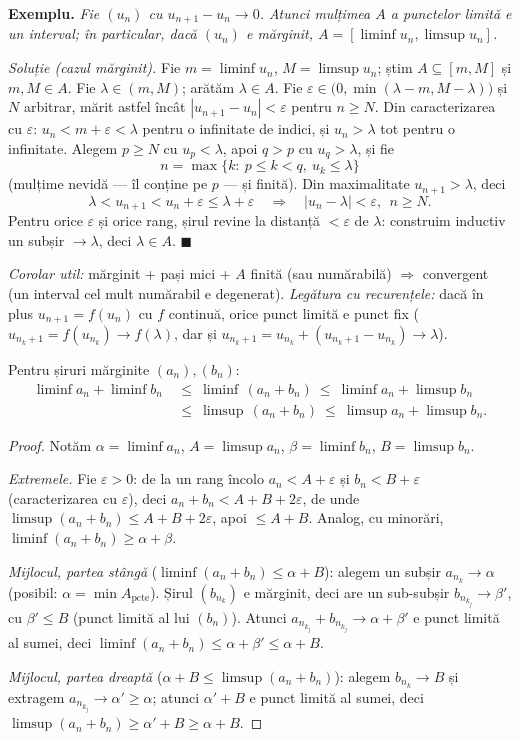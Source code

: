 \textbf{Exemplu.} \emph{Fie $(u_n)$ cu $u_{n+1}-u_n\to0$. Atunci mulțimea $A$ a punctelor limită e un interval; în particular, dacă $(u_n)$ e mărginit, $A=[\liminf u_n,\limsup u_n]$.}

\emph{Soluție (cazul mărginit).} Fie $m=\liminf u_n$, $M=\limsup u_n$; știm $A\subseteq[m,M]$ și $m,M\in A$. Fie $\lambda\in(m,M)$; arătăm $\lambda\in A$. Fie $\varepsilon\in\big(0,\min(\lambda-m,M-\lambda)\big)$ și $N$ arbitrar, mărit astfel încât $|u_{n+1}-u_n|<\varepsilon$ pentru $n\ge N$. Din caracterizarea cu $\varepsilon$: $u_n<m+\varepsilon<\lambda$ pentru o infinitate de indici, și $u_n>\lambda$ tot pentru o infinitate. Alegem $p\ge N$ cu $u_p<\lambda$, apoi $q>p$ cu $u_q>\lambda$, și fie
\[
n=\max\{k:\ p\le k<q,\ u_k\le\lambda\}
\]
(mulțime nevidă --- îl conține pe $p$ --- și finită). Din maximalitate $u_{n+1}>\lambda$, deci
\[
\lambda<u_{n+1}<u_n+\varepsilon\le\lambda+\varepsilon
\quad\Longrightarrow\quad
|u_n-\lambda|<\varepsilon,\ \ n\ge N.
\]
Pentru orice $\varepsilon$ și orice rang, șirul revine la distanță $<\varepsilon$ de $\lambda$: construim inductiv un subșir $\to\lambda$, deci $\lambda\in A$. $\blacksquare$

\emph{Corolar util:} mărginit + pași mici + $A$ finită (sau numărabilă) $\Rightarrow$ convergent (un interval cel mult numărabil e degenerat). \emph{Legătura cu recurențele:} dacă în plus $u_{n+1}=f(u_n)$ cu $f$ continuă, orice punct limită e punct fix ($u_{n_k+1}=f(u_{n_k})\to f(\lambda)$, dar și $u_{n_k+1}=u_{n_k}+(u_{n_k+1}-u_{n_k})\to\lambda$).

\begin{teorema}
Pentru șiruri mărginite $(a_n),(b_n)$:
\[
\begin{aligned}
\liminf a_n+\liminf b_n&\ \le\ \liminf\,(a_n+b_n)\ \le\ \liminf a_n+\limsup b_n\\
&\ \le\ \limsup\,(a_n+b_n)\ \le\ \limsup a_n+\limsup b_n.
\end{aligned}
\]
\end{teorema}
\begin{proof}
Notăm $\alpha=\liminf a_n$, $A=\limsup a_n$, $\beta=\liminf b_n$, $B=\limsup b_n$.

\emph{Extremele.} Fie $\varepsilon>0$: de la un rang încolo $a_n<A+\varepsilon$ și $b_n<B+\varepsilon$ (caracterizarea cu $\varepsilon$), deci $a_n+b_n<A+B+2\varepsilon$, de unde $\limsup(a_n+b_n)\le A+B+2\varepsilon$, apoi $\le A+B$. Analog, cu minorări, $\liminf(a_n+b_n)\ge\alpha+\beta$.

\emph{Mijlocul, partea stângă} ($\liminf(a_n+b_n)\le\alpha+B$): alegem un subșir $a_{n_k}\to\alpha$ (posibil: $\alpha=\min A_{\text{pcte}}$). Șirul $(b_{n_k})$ e mărginit, deci are un sub-subșir $b_{n_{k_j}}\to\beta'$, cu $\beta'\le B$ (punct limită al lui $(b_n)$). Atunci $a_{n_{k_j}}+b_{n_{k_j}}\to\alpha+\beta'$ e punct limită al sumei, deci $\liminf(a_n+b_n)\le\alpha+\beta'\le\alpha+B$.

\emph{Mijlocul, partea dreaptă} ($\alpha+B\le\limsup(a_n+b_n)$): alegem $b_{n_k}\to B$ și extragem $a_{n_{k_j}}\to\alpha'\ge\alpha$; atunci $\alpha'+B$ e punct limită al sumei, deci $\limsup(a_n+b_n)\ge\alpha'+B\ge\alpha+B$.
\end{proof}

